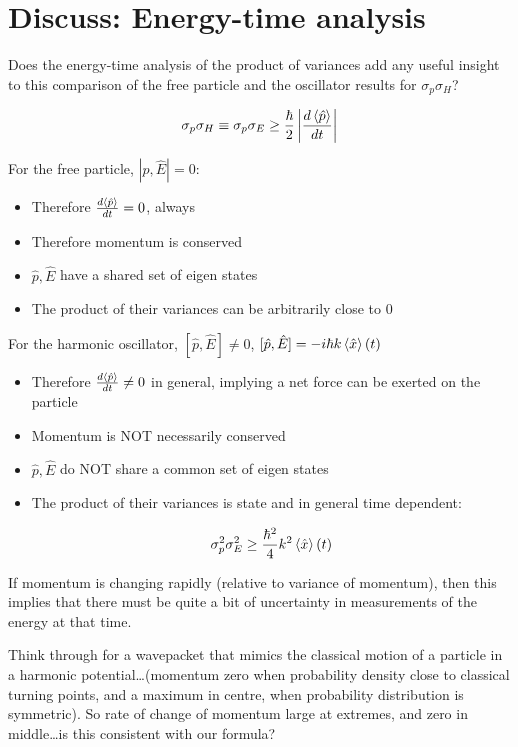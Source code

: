 \documentclass{article}
\begin{document}
\section{Discuss: Energy-time analysis}

Does the energy-time analysis of the product of variances add any useful insight to this comparison of the free particle and the oscillator results for $\sigma_p \sigma_H$?

$$\sigma_p \sigma_H \equiv \sigma_p \sigma_E \geq \frac{\hbar}{2} \left| \frac{d \braket{\hat{p}}}{dt} \right|$$

For the free particle, $|\hat{p}, \hat{E}| = 0$:

\begin{itemize}
    \item Therefore $\frac{d \braket{\hat{p}}}{dt} = 0$, always
    \item Therefore momentum is conserved
    \item $\hat{p}, \hat{E}$ have a shared set of eigen states
    \item The product of their variances can be arbitrarily close to 0
\end{itemize}

For the harmonic oscillator, $[\hat{p}, \hat{E}] \neq 0$, $[\hat{p}, \hat{E}] = -i\hbar k \braket{\hat{x}} (t)$

\begin{itemize}
    \item Therefore  $\frac{d \braket{\hat{p}}}{dt} \neq 0$ in general, implying a net force can be exerted on the particle
    \item Momentum is NOT necessarily conserved
    \item $\hat{p}, \hat{E}$ do NOT share a common set of eigen states
    \item The product of their variances is state and in general time dependent:
    
    $$\sigma_p^2 \sigma_E^2 \geq \frac{\hbar^2}{4} k^2 \braket{\hat{x}} (t)$$
\end{itemize}

If momentum is changing rapidly (relative to variance of momentum), then this implies that there must be quite a bit of uncertainty in measurements of the energy at that time.  

Think through for a wavepacket that mimics the classical motion of a particle in a harmonic potential…(momentum zero when probability density close to classical turning points, and a maximum in centre, when probability distribution is symmetric).  So rate of change of momentum large at extremes, and zero in middle…is this consistent with our formula?
\end{document}

